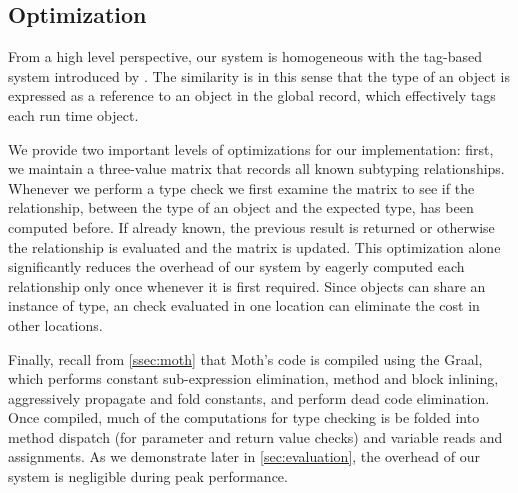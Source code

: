 \subsection{Optimization}
\label{sec:optimization}

From a high level perspective, 
our system is homogeneous with the tag-based system introduced by \citet{Greenman2017}.
The similarity is in this sense that the type of an object is expressed as a reference
to an object in the global record, which
effectively tags each run time object.

We provide two important levels of optimizations for our implementation: 
first, we maintain a three-value matrix that records all known subtyping relationships. 
Whenever we perform a type check we first examine the matrix to see if the relationship, 
between the type of an object and the expected type, has been computed before.
If already known, the previous result is returned 
or otherwise the relationship is evaluated and the matrix is updated.
This optimization alone significantly reduces the overhead of our system 
by eagerly computed each relationship only once whenever it is first required. 
Since objects can share an instance of type,
an check evaluated in one location can eliminate the cost in other locations.

Finally, recall from \cref{ssec:moth} that
Moth's code is compiled using the Graal, 
which performs
constant sub-expression elimination,
method and block inlining,
aggressively propagate and fold constants, and
perform dead code elimination.
Once compiled, much of the computations for type checking
is be folded into method dispatch
(for parameter and return value checks)
and variable reads and assignments.
As we demonstrate later in \cref{sec:evaluation}, 
the overhead of our system is negligible during peak performance.
